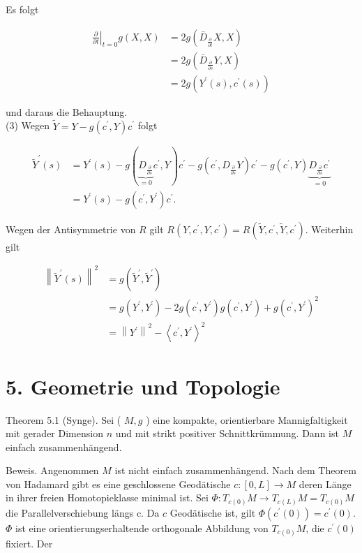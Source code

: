 \documentclass[10pt]{article}
\begin{document}
Es folgt

$$
\begin{aligned}
\left.\frac{\partial}{\partial t}\right|_{t=0} g(X, X) & =2 g\left(\bar{D}_{\frac{\partial}{\partial t}} X, X\right) \\
& =2 g\left(\bar{D}_{\frac{\partial}{\partial s}} Y, X\right) \\
& =2 g\left(Y^{\prime}(s), c^{\prime}(s)\right)
\end{aligned}
$$

und daraus die Behauptung.\\
(3) Wegen $\tilde{Y}=Y-g\left(c^{\prime}, Y\right) c^{\prime}$ folgt

$$
\begin{aligned}
\tilde{Y}^{\prime}(s) & =Y^{\prime}(s)-g(\underbrace{D_{\frac{\partial}{\partial s}}}_{=0} c^{\prime}, Y) c^{\prime}-g\left(c^{\prime}, D_{\frac{\partial}{\partial s}} Y\right) c^{\prime}-g\left(c^{\prime}, Y\right) \underbrace{D_{\frac{\partial}{\partial s}} c^{\prime}}_{=0} \\
& =Y^{\prime}(s)-g\left(c^{\prime}, Y^{\prime}\right) c^{\prime} .
\end{aligned}
$$

Wegen der Antisymmetrie von $R$ gilt $R\left(Y, c^{\prime}, Y, c^{\prime}\right)=R\left(\tilde{Y}, c^{\prime}, \tilde{Y}, c^{\prime}\right)$. Weiterhin gilt

$$
\begin{aligned}
\left\|\tilde{Y}^{\prime}(s)\right\|^{2} & =g\left(\tilde{Y}^{\prime}, \tilde{Y}^{\prime}\right) \\
& =g\left(Y^{\prime}, Y^{\prime}\right)-2 g\left(c^{\prime}, Y^{\prime}\right) g\left(c^{\prime}, Y^{\prime}\right)+g\left(c^{\prime}, Y^{\prime}\right)^{2} \\
& =\left\|Y^{\prime}\right\|^{2}-\left\langle c^{\prime}, Y^{\prime}\right\rangle^{2}
\end{aligned}
$$

\section*{5. Geometrie und Topologie}
Theorem 5.1 (Synge). Sei ( $M, g$ ) eine kompakte, orientierbare Mannigfaltigkeit mit gerader Dimension $n$ und mit strikt positiver Schnittkrümmung. Dann ist $M$ einfach zusammenhängend.

Beweis. Angenommen $M$ ist nicht einfach zusammenhängend. Nach dem Theorem von Hadamard gibt es eine geschlossene Geodätische $c:[0, L] \rightarrow M$ deren Länge in ihrer freien Homotopieklasse minimal ist. Sei $\Phi: T_{c(0)} M \rightarrow T_{c(L)} M=T_{c(0)} M$ die Parallelverschiebung längs c. Da $c$ Geodätische ist, gilt $\Phi\left(c^{\prime}(0)\right)=c^{\prime}(0)$. $\Phi$ ist eine orientierungserhaltende orthogonale Abbildung von $T_{c(0)} M$, die $c^{\prime}(0)$ fixiert. Der
\end{document}
